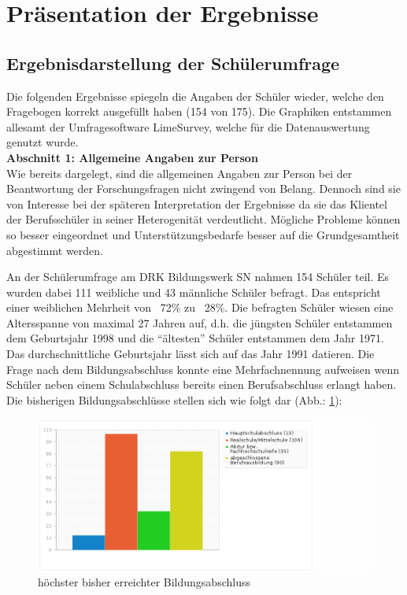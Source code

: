 \section{Präsentation der Ergebnisse}
\label{sec:PräsentationDerErgebnisse}

\subsection{Ergebnisdarstellung der Schülerumfrage}
\label{sec:ErgebnisdarstellungDerSchülerumfrage}

Die folgenden Ergebnisse spiegeln die Angaben der Schüler wieder, welche den Fragebogen korrekt ausgefüllt haben (154 von 175). Die Graphiken entstammen allesamt der Umfragesoftware LimeSurvey, welche für die Datenauswertung genutzt wurde.\\[0,5cm]

\noindent
\textbf{Abschnitt 1: Allgemeine Angaben zur Person}\\
Wie bereits dargelegt, sind die allgemeinen Angaben zur Person bei der Beantwortung der Forschungsfragen nicht zwingend von Belang. Dennoch sind sie von Interesse bei der späteren Interpretation der Ergebnisse da sie das Klientel der Berufsschüler in seiner Heterogenität verdeutlicht. Mögliche Probleme können so besser eingeordnet und Unterstützungsbedarfe besser auf die Grundgesamtheit abgestimmt werden.

An der Schülerumfrage am DRK Bildungswerk SN nahmen 154 Schüler teil. Es wurden dabei 111 weibliche und 43 männliche
Schüler befragt. Das entspricht einer weiblichen Mehrheit von ~72\% zu ~28\%. Die befragten Schüler wiesen eine Altersspanne von maximal 27 Jahren auf, d.h. die jüngsten Schüler entstammen dem Geburtsjahr 1998 und die "`ältesten"' Schüler entstammen dem Jahr 1971. Das durchschnittliche Geburtsjahr lässt sich auf das Jahr 1991 datieren. Die Frage nach dem Bildungsabschluss konnte eine Mehrfachnennung aufweisen wenn Schüler neben einem Schulabschluss bereits einen Berufsabschluss erlangt haben. Die bisherigen Bildungsabschlüsse stellen sich wie folgt dar (Abb.: \ref{fig:Hoechster-bisher-erreichter-Bildungsabschluss}):

\begin{figure}[hp]
	\centering
		\includegraphics[width=1.0\textwidth]{images/Hoechster-bisher-erreichter-Bildungsabschluss.png}
	\caption{höchster bisher erreichter Bildungsabschluss}
	\label{fig:Hoechster-bisher-erreichter-Bildungsabschluss}
\end{figure}

